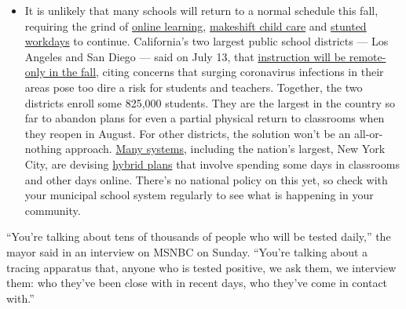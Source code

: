 \begin{itemize}
  \begin{itemize}
  \tightlist
  \item
    It is unlikely that many schools will return to a normal schedule
    this fall, requiring the grind of
    \href{https://www.nytimes3xbfgragh.onion/2020/06/05/us/coronavirus-education-lost-learning.html?action=click\&pgtype=Article\&state=default\&region=MAIN_CONTENT_3\&context=storylines_faq}{online
    learning},
    \href{https://www.nytimes3xbfgragh.onion/2020/05/29/us/coronavirus-child-care-centers.html?action=click\&pgtype=Article\&state=default\&region=MAIN_CONTENT_3\&context=storylines_faq}{makeshift
    child care} and
    \href{https://www.nytimes3xbfgragh.onion/2020/06/03/business/economy/coronavirus-working-women.html?action=click\&pgtype=Article\&state=default\&region=MAIN_CONTENT_3\&context=storylines_faq}{stunted
    workdays} to continue. California's two largest public school
    districts --- Los Angeles and San Diego --- said on July 13, that
    \href{https://www.nytimes3xbfgragh.onion/2020/07/13/us/lausd-san-diego-school-reopening.html?action=click\&pgtype=Article\&state=default\&region=MAIN_CONTENT_3\&context=storylines_faq}{instruction
    will be remote-only in the fall}, citing concerns that surging
    coronavirus infections in their areas pose too dire a risk for
    students and teachers. Together, the two districts enroll some
    825,000 students. They are the largest in the country so far to
    abandon plans for even a partial physical return to classrooms when
    they reopen in August. For other districts, the solution won't be an
    all-or-nothing approach.
    \href{https://bioethics.jhu.edu/research-and-outreach/projects/eschool-initiative/school-policy-tracker/}{Many
    systems}, including the nation's largest, New York City, are
    devising
    \href{https://www.nytimes3xbfgragh.onion/2020/06/26/us/coronavirus-schools-reopen-fall.html?action=click\&pgtype=Article\&state=default\&region=MAIN_CONTENT_3\&context=storylines_faq}{hybrid
    plans} that involve spending some days in classrooms and other days
    online. There's no national policy on this yet, so check with your
    municipal school system regularly to see what is happening in your
    community.
  \end{itemize}
\end{itemize}

``You're talking about tens of thousands of people who will be tested
daily,'' the mayor said in an interview on MSNBC on Sunday. ``You're
talking about a tracing apparatus that, anyone who is tested positive,
we ask them, we interview them: who they've been close with in recent
days, who they've come in contact with.''

